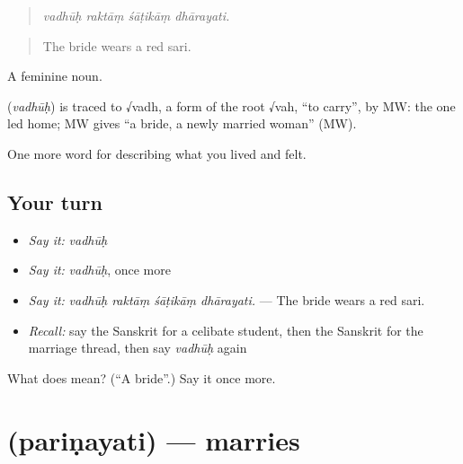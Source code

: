 \begin{quote}
   
\end{quote}

\begin{quote}
\emph{vadhūḥ raktāṃ śāṭikāṃ dhārayati.}
\end{quote}

\begin{quote}
The bride wears a red sari.
\end{quote}

A feminine noun.

\begin{cousinweb}
\textbf{} (\emph{vadhūḥ}) is traced to √vadh, a form of the root √vah, \textquotedblleft{}to carry\textquotedblright{}, by MW: the one led home; MW gives \textquotedblleft{}a bride, a newly married woman\textquotedblright{} (MW).
\end{cousinweb}

\begin{grammarlens}[title={What you've built}]
One more word for describing what you lived and felt.
\end{grammarlens}

\subsection*{Your turn}
\begin{itemize}
\raggedright
  \item \emph{Say it:} \emph{vadhūḥ}
  \item \emph{Say it:} \emph{vadhūḥ}, once more
  \item \emph{Say it:} \emph{vadhūḥ raktāṃ śāṭikāṃ dhārayati.} — The bride wears a red sari.
  \item \emph{Recall:} say the Sanskrit for a celibate student, then the Sanskrit for the marriage thread, then say \emph{vadhūḥ} again
\end{itemize}

\begin{tcolorbox}[breakable,colback=teal!4,colframe=teal!35!black,title={Before you move on}]
What does  mean? (\textquotedblleft{}A bride\textquotedblright{}.) Say it once more.
\end{tcolorbox}
\section[\texorpdfstring{\sk{परिणयति} (pariṇayati)}{परिणयति (pariṇayati)}]{ (pariṇayati) — marries}

